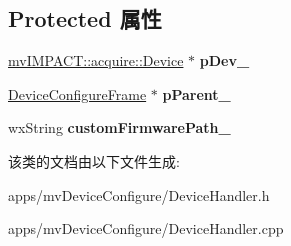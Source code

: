 \subsection*{Protected 属性}
\begin{DoxyCompactItemize}
\item 
\hypertarget{class_device_handler_a6d3fd5f165ae830ce42369a0d489a1a6}{\hyperlink{classmv_i_m_p_a_c_t_1_1acquire_1_1_device}{mv\+I\+M\+P\+A\+C\+T\+::acquire\+::\+Device} $\ast$ {\bfseries p\+Dev\+\_\+}}\label{class_device_handler_a6d3fd5f165ae830ce42369a0d489a1a6}

\item 
\hypertarget{class_device_handler_ab5a2b3e51f3e85d0cabc0d32370e3add}{\hyperlink{class_device_configure_frame}{Device\+Configure\+Frame} $\ast$ {\bfseries p\+Parent\+\_\+}}\label{class_device_handler_ab5a2b3e51f3e85d0cabc0d32370e3add}

\item 
\hypertarget{class_device_handler_ae70485ebefeeeca665b384dd5c47b3e6}{wx\+String {\bfseries custom\+Firmware\+Path\+\_\+}}\label{class_device_handler_ae70485ebefeeeca665b384dd5c47b3e6}

\end{DoxyCompactItemize}


该类的文档由以下文件生成\+:\begin{DoxyCompactItemize}
\item 
apps/mv\+Device\+Configure/Device\+Handler.\+h\item 
apps/mv\+Device\+Configure/Device\+Handler.\+cpp\end{DoxyCompactItemize}
